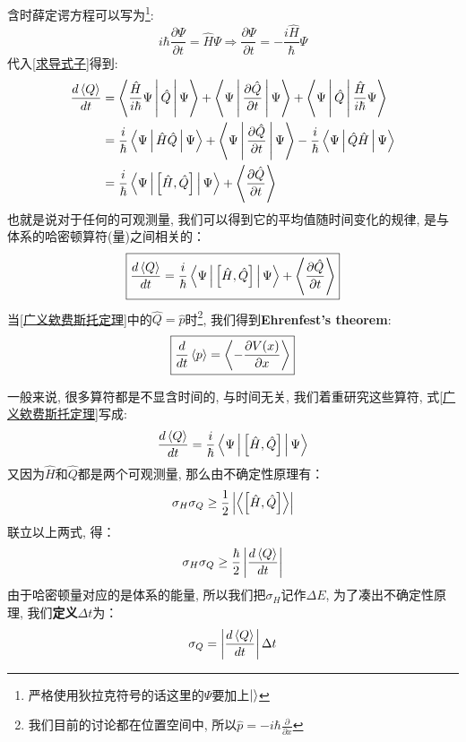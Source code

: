 \documentclass[a4paper,zihao=-4,linespread=1]{ctexrep}
\begin{document}
    含时薛定谔方程可以写为\footnote{严格使用狄拉克符号的话这里的$\Psi$要加上$\ket{}$}:
    \[i\hbar\frac{\partial \Psi}{\partial t}=\hat H\Psi\Rightarrow\frac{\partial \Psi}{\partial t}=-\frac{i\hat H}{\hbar}\Psi\]
    代入\ref{求导式子}得到:
    \begin{align*}
        \frac{d\braket{Q}}{dt}&=\Braket{\frac{\hat{H}}{i\hbar}\Psi |\hat{Q}|\Psi}+\Braket{\Psi|\frac{\partial \hat{Q}}{\partial t}|\Psi}+\Braket{\Psi|\hat{Q}| \frac{\hat H}{i\hbar}\Psi}\\
        &=\frac{i}{\hbar}\Braket{\Psi|\hat H\hat Q|\Psi}+\Braket{\Psi|\frac{\partial \hat{Q}}{\partial t}|\Psi}-\frac{i}{\hbar}\Braket{\Psi|\hat Q\hat H|\Psi}\\
        &=\frac{i}{\hbar}\Braket{\Psi|\left[\hat H,\hat Q\right]|\Psi}+\Braket{\frac{\partial \hat Q}{\partial t}}
    \end{align*}
    也就是说对于任何的可观测量, 我们可以得到它的平均值随时间变化的规律, 是与体系的哈密顿算符(量)之间相关的：
    \begin{equation}
        \label{广义欸费斯托定理}
        \boxed{
            \frac{d\braket{Q}}{dt}=\frac{i}{\hbar}\Braket{\Psi|\left[\hat H,\hat Q\right]|\Psi}+\Braket{\frac{\partial \hat Q}{\partial t}}
        }
    \end{equation}
    当\ref{广义欸费斯托定理}中的$\hat Q=\hat p$时\footnote{我们目前的讨论都在位置空间中, 所以$\hat p=-i\hbar\frac{\partial}{\partial x}$}, 我们得到\textbf{Ehrenfest's theorem}:
    \begin{equation}
        \boxed{\frac{d}{dt}\braket{p}=\Braket{-\frac{\partial V(x)}{\partial x}}}
    \end{equation}
    
    一般来说, 很多算符都是不显含时间的, 与时间无关, 我们着重研究这些算符, 式\ref{广义欸费斯托定理}写成:
    \[\frac{d\braket{Q}}{dt}=\frac{i}{\hbar}\Braket{\Psi|\left[\hat H,\hat Q\right]|\Psi}\]
    又因为$\hat{H}$和$\hat{Q}$都是两个可观测量, 那么由不确定性原理有：
    \[\sigma_H\sigma_Q\geq\frac{1}{2}\left|\Braket{\left[\hat H,\hat Q\right]}\right|\]
    联立以上两式, 得：
    \begin{equation}
        \label{H-Q}
        \sigma_H\sigma_Q\geq\frac{\hbar}{2}\left|\frac{d\braket{Q}}{dt}\right|
    \end{equation}
    由于哈密顿量对应的是体系的能量, 所以我们把$\sigma_H$记作$\Delta E$, 为了凑出不确定性原理, 我们\textbf{定义}$\Delta t$为：
    \begin{equation}
        \label{define dt}
        \sigma_Q=\left|\frac{d\braket{Q}}{dt}\right|\Delta t
    \end{equation}
    
\end{document}

